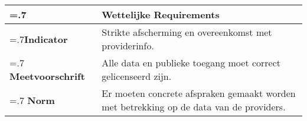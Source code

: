 \noindent
\begin{longtable}{|>{\raggedleft\hsize=.7\hsize\bfseries}X|
    >{\arraybackslash\hsize=1.3\hsize}X|} \hline
\multicolumn{1}{|l|}{\textbf{NFR}} & Wettelijke Requirements\\ \hline
Indicator & Strikte afscherming en overeenkomst met providerinfo.\\  \hline
Meetvoorschrift & Alle data en publieke toegang moet correct gelicenseerd zijn.\\ \hline
Norm & Er moeten concrete afspraken gemaakt worden met betrekking op de data van de providers.\\ \hline
\end{longtable}